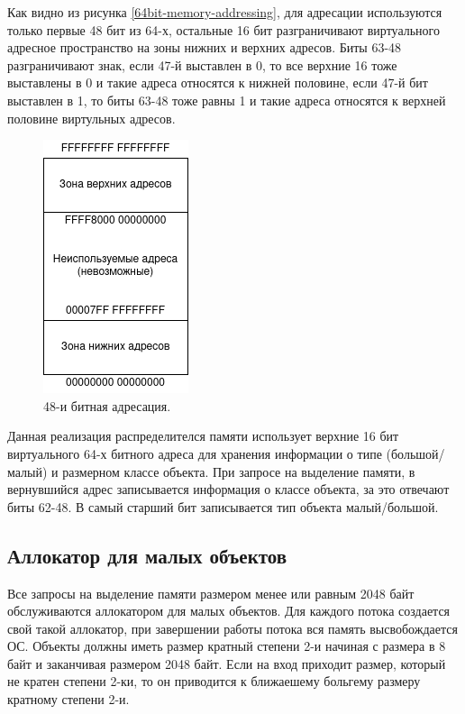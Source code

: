 Как видно из рисунка \ref{64bit-memory-addressing}, для адресации используются только первые 48 бит из 64-х, остальные 16 бит разграничивают виртуального адресное пространство на зоны нижних и верхних адресов. Биты 63-48 разграничивают знак, если 47-й выставлен в 0, то все верхние 16 тоже выставлены в 0 и такие адреса относятся к нижней половине, если 47-й бит выставлен в 1, то биты 63-48 тоже равны 1 и такие адреса относятся к верхней половине виртульных адресов.

\begin{figure}[!h]
	\begin{center}
		\includegraphics[scale=0.6]{images/48bit-half-spaces.png}
		\caption{48-и битная адресация.}
		\label{48bit-half-spaces}
	\end{center}
\end{figure}

Данная реализация распределителся памяти использует верхние 16 бит виртуального 64-х битного адреса для хранения информации о типе (большой/малый) и размерном классе объекта. При запросе на выделение памяти, в вернувшийся адрес записывается информация о классе объекта, за это отвечают биты 62-48. В самый старший бит записывается тип объекта малый/большой.

\subsection{Аллокатор для малых объектов}
Все запросы на выделение памяти размером менее или равным 2048 байт обслуживаются аллокатором для малых объектов. Для каждого потока создается свой такой аллокатор, при завершении работы потока вся память высвобождается ОС. Объекты должны иметь размер кратный степени 2-и начиная с размера в 8 байт и заканчивая размером 2048 байт. Если на вход приходит размер, который не кратен степени 2-ки, то он приводится к ближаешему больгему размеру кратному степени 2-и.

